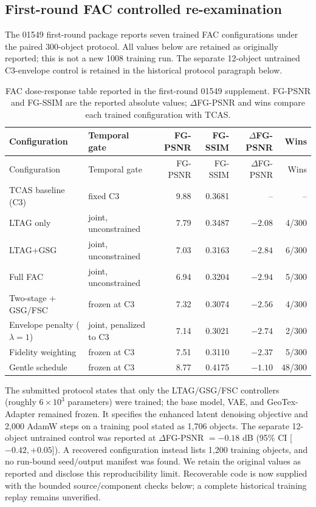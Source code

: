 \documentclass[11pt]{article}
\begin{document}
\clearpage
\subsection*{First-round FAC controlled re-examination}\label{supp:fac-historical}
The 01549 first-round package reports seven trained FAC configurations under the paired 300-object protocol. All values below are retained as originally reported; this is not a new 1008 training run. The separate 12-object untrained C3-envelope control is retained in the historical protocol paragraph below.

\begin{longtable}{p{3.3cm}p{3.5cm}rrrr}
\caption{FAC dose-response table reported in the first-round 01549 supplement. FG-PSNR and FG-SSIM are the reported absolute values; $\Delta$FG-PSNR and wins compare each trained configuration with TCAS.}\label{tab:fac-dose-response}\\
\toprule
Configuration & Temporal gate & FG-PSNR & FG-SSIM & $\Delta$FG-PSNR & Wins \\
\midrule\endfirsthead
\toprule
Configuration & Temporal gate & FG-PSNR & FG-SSIM & $\Delta$FG-PSNR & Wins \\
\midrule\endhead
TCAS baseline (C3) & fixed C3 & 9.88 & 0.3681 & -- & -- \\
LTAG only & joint, unconstrained & 7.79 & 0.3487 & $-2.08$ & 4/300 \\
LTAG+GSG & joint, unconstrained & 7.03 & 0.3163 & $-2.84$ & 6/300 \\
Full FAC & joint, unconstrained & 6.94 & 0.3204 & $-2.94$ & 5/300 \\
Two-stage + GSG/FSC & frozen at C3 & 7.32 & 0.3074 & $-2.56$ & 4/300 \\
Envelope penalty ($\lambda=1$) & joint, penalized to C3 & 7.14 & 0.3021 & $-2.74$ & 2/300 \\
Fidelity weighting & frozen at C3 & 7.51 & 0.3110 & $-2.37$ & 5/300 \\
Gentle schedule & frozen at C3 & 8.77 & 0.4175 & $-1.10$ & 48/300 \\
\bottomrule
\end{longtable}

The submitted protocol states that only the LTAG/GSG/FSC controllers (roughly $6\times10^3$ parameters) were trained; the base model, VAE, and GeoTex-Adapter remained frozen. It specifies the enhanced latent denoising objective and 2,000 AdamW steps on a training pool stated as 1,706 objects. The separate 12-object untrained control was reported at $\Delta$FG-PSNR $=-0.18$ dB (95\% CI [$-0.42,+0.05$]). A recovered configuration instead lists 1,200 training objects, and no run-bound seed/output manifest was found. We retain the original values as reported and disclose this reproducibility limit. Recoverable code is now supplied with the bounded source/component checks below; a complete historical training replay remains unverified.
\end{document}
